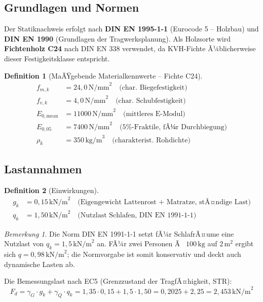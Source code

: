 ﻿\documentclass[12pt,a4paper]{article}
\theoremstyle{definition}
\newtheorem{definition}{Definition}
\theoremstyle{plain}
\theoremstyle{remark}
\newtheorem{bemerkung}{Bemerkung}
\begin{document}
\subsection{Grundlagen und Normen}

Der Statiknachweis erfolgt nach \textbf{DIN EN 1995-1-1} (Eurocode 5 -- Holzbau)
und \textbf{DIN EN 1990} (Grundlagen der Tragwerksplanung). Als Holzsorte wird
\textbf{Fichtenholz C24} nach DIN EN 338 verwendet, da KVH-Fichte Ã¼blicherweise
dieser Festigkeitsklasse entspricht.

\begin{definition}[MaÃŸgebende Materialkennwerte -- Fichte C24]
\begin{align*}
f_{m,k}   &= 24{,}0\,\text{N/mm}^2 \quad \text{(char. Biegefestigkeit)} \\
f_{v,k}   &= 4{,}0\,\text{N/mm}^2  \quad \text{(char. Schubfestigkeit)}  \\
E_{0,\text{mean}} &= 11000\,\text{N/mm}^2 \quad \text{(mittleres E-Modul)} \\
E_{0,05}  &= 7400\,\text{N/mm}^2   \quad \text{(5\%-Fraktile, fÃ¼r Durchbiegung)} \\
\rho_k    &= 350\,\text{kg/m}^3    \quad \text{(charakterist. Rohdichte)}
\end{align*}
\end{definition}

\subsection{Lastannahmen}

\begin{definition}[Einwirkungen]
\begin{align*}
g_k  &= 0{,}15\,\text{kN/m}^2 \quad \text{(Eigengewicht Lattenrost + Matratze, stÃ¤ndige Last)}\\
q_k  &= 1{,}50\,\text{kN/m}^2 \quad \text{(Nutzlast Schlafen, DIN EN 1991-1-1)}
\end{align*}
\end{definition}

\begin{bemerkung}
Die Norm DIN EN 1991-1-1 setzt fÃ¼r SchlafrÃ¤ume eine Nutzlast von $q_k = 1{,}5\,\text{kN/m}^2$ an.
FÃ¼r zwei Personen Ã  $100\,\text{kg}$ auf $2\,\text{m}^2$ ergibt sich $q = 0{,}98\,\text{kN/m}^2$;
die Normvorgabe ist somit konservativ und deckt auch dynamische Lasten ab.
\end{bemerkung}

Die Bemessungslast nach EC5 (Grenzzustand der TragfÃ¤higkeit, STR):
\begin{equation}
  F_d = \gamma_G \cdot g_k + \gamma_Q \cdot q_k
      = 1{,}35 \cdot 0{,}15 + 1{,}5 \cdot 1{,}50
      = 0{,}2025 + 2{,}25
      = 2{,}453\,\text{kN/m}^2
\end{equation}
\end{document}
